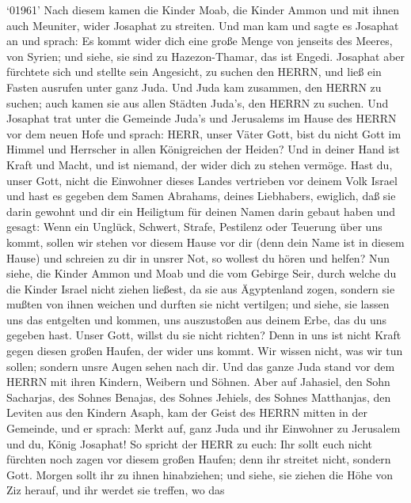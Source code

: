  `01961' Nach diesem kamen die Kinder Moab, die Kinder Ammon
und mit ihnen auch Meuniter, wider Josaphat zu streiten. 
Und man kam und sagte es Josaphat an und sprach: Es kommt wider dich
eine große Menge von jenseits des Meeres, von Syrien; und siehe, sie
sind zu Hazezon-Thamar, das ist Engedi.  Josaphat aber
fürchtete sich und stellte sein Angesicht, zu suchen den HERRN, und ließ
ein Fasten ausrufen unter ganz Juda.  Und Juda kam zusammen,
den HERRN zu suchen; auch kamen sie aus allen Städten Juda's, den HERRN
zu suchen.  Und Josaphat trat unter die Gemeinde Juda's und
Jerusalems im Hause des HERRN vor dem neuen Hofe  und
sprach: HERR, unser Väter Gott, bist du nicht Gott im Himmel und
Herrscher in allen Königreichen der Heiden? Und in deiner Hand ist Kraft
und Macht, und ist niemand, der wider dich zu stehen vermöge.
 Hast du, unser Gott, nicht die Einwohner dieses Landes
vertrieben vor deinem Volk Israel und hast es gegeben dem Samen
Abrahams, deines Liebhabers, ewiglich,  daß sie darin
gewohnt und dir ein Heiligtum für deinen Namen darin gebaut haben und
gesagt:  Wenn ein Unglück, Schwert, Strafe, Pestilenz oder
Teuerung über uns kommt, sollen wir stehen vor diesem Hause vor dir
(denn dein Name ist in diesem Hause) und schreien zu dir in unsrer Not,
so wollest du hören und helfen?  Nun siehe, die Kinder
Ammon und Moab und die vom Gebirge Seir, durch welche du die Kinder
Israel nicht ziehen ließest, da sie aus Ägyptenland zogen, sondern sie
mußten von ihnen weichen und durften sie nicht vertilgen; 
und siehe, sie lassen uns das entgelten und kommen, uns auszustoßen aus
deinem Erbe, das du uns gegeben hast.  Unser Gott, willst
du sie nicht richten? Denn in uns ist nicht Kraft gegen diesen großen
Haufen, der wider uns kommt. Wir wissen nicht, was wir tun sollen;
sondern unsre Augen sehen nach dir.  Und das ganze Juda
stand vor dem HERRN mit ihren Kindern, Weibern und Söhnen. 
Aber auf Jahasiel, den Sohn Sacharjas, des Sohnes Benajas, des Sohnes
Jehiels, des Sohnes Matthanjas, den Leviten aus den Kindern Asaph, kam
der Geist des HERRN mitten in der Gemeinde,  und er sprach:
Merkt auf, ganz Juda und ihr Einwohner zu Jerusalem und du, König
Josaphat! So spricht der HERR zu euch: Ihr sollt euch nicht fürchten
noch zagen vor diesem großen Haufen; denn ihr streitet nicht, sondern
Gott.  Morgen sollt ihr zu ihnen hinabziehen; und siehe,
sie ziehen die Höhe von Ziz herauf, und ihr werdet sie treffen, wo das

